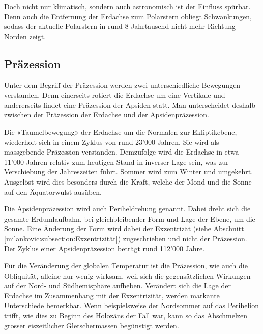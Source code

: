 Doch nicht nur klimatisch, sondern auch astronomisch ist der Einfluss spürbar.
Denn auch die Entfernung der Erdachse zum Polarstern obliegt Schwankungen, sodass der aktuelle Polarstern in rund 8 Jahrtausend nicht mehr Richtung Norden zeigt.

\subsection{Präzession
\label{milankovic:subsection:Präzession}}
Unter dem Begriff der Präzession werden zwei unterschiedliche Bewegungen verstanden.
Denn einerseits rotiert die Erdachse um eine Vertikale und andererseits findet eine Präzession der Apsiden statt.
Man unterscheidet deshalb zwischen der Präzession der Erdachse und der Apsidenpräzession.

Die «Taumelbewegung» der Erdachse um die Normalen zur Ekliptikebene,  wiederholt sich in einem Zyklus von rund 23'000 Jahren.
Sie wird als massgebende Präzession verstanden.
Demzufolge wird die Erdachse in etwa 11'000 Jahren relativ zum heutigen Stand in inverser Lage sein, was zur Verschiebung der Jahreszeiten führt.
Sommer wird zum Winter und umgekehrt.
Ausgelöst wird dies besonders durch die Kraft, welche der Mond und die Sonne auf den Äquatorwulst ausüben.

Die Apsidenpräzession wird auch Periheldrehung genannt.
Dabei dreht sich die gesamte Erdumlaufbahn, bei gleichbleibender Form und Lage der Ebene, um die Sonne. Eine Änderung der Form wird dabei der Exzentrizät
(siehe Abschnitt \ref{milankovic:subsection:Exzentrizität})
zugeschrieben und nicht der Präzession.
Der Zyklus einer Apsidenpräzession beträgt rund 112'000 Jahre.

Für die Veränderung der globalen Temperatur ist die Präzession, wie auch die Obliquität, alleine nur wenig wirksam, weil sich die gegensätzlichen Wirkungen auf der Nord- und Südhemisphäre aufheben.
Verändert sich die Lage der Erdachse im Zusammenhang mit der Exzentrizität, werden markante Unterschiede bemerkbar.
Wenn beispielsweise der Nordsommer auf das Perihelion trifft, wie dies zu Beginn des Holozäns der Fall war, kann so das Abschmelzen grosser eiszeitlicher Gletschermassen begünstigt werden.

